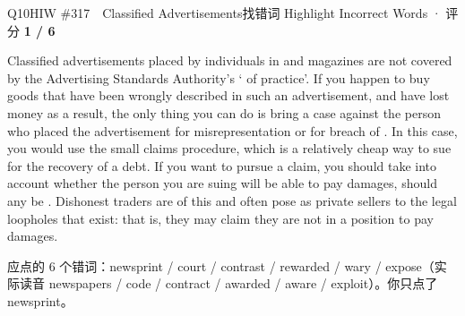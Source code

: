 \begin{qblock}{Q10\quad HIW \#317\ \ Classified Advertisements}{找错词 Highlight Incorrect Words · 评分 \textcolor{cAccent}{\bfseries 1 / 6}}
\begin{promptbox}
Classified advertisements placed by individuals in  and magazines are not covered by the Advertising Standards Authority's ` of practice'. If you happen to buy goods that have been wrongly described in such an advertisement, and have lost money as a result, the only thing you can do is bring a case against the person who placed the advertisement for misrepresentation or for breach of . In this case, you would use the small claims procedure, which is a relatively cheap way to sue for the recovery of a debt. If you want to pursue a claim, you should take into account whether the person you are suing will be able to pay damages, should any be . Dishonest traders are  of this and often pose as private sellers to  the legal loopholes that exist: that is, they may claim they are not in a position to pay damages.
\end{promptbox}
\par{\small 应点的 6 个错词：{\color{cWrong}newsprint / court / contrast / rewarded / wary / expose}\quad（实际读音 newspapers / code / contract / awarded / aware / exploit）。\;你只点了 {\color{cWrong}newsprint}。}
\end{qblock}

